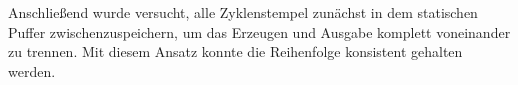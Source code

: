 Anschließend wurde versucht, alle Zyklenstempel zunächst in dem statischen
Puffer zwischenzuspeichern, um das Erzeugen und Ausgabe komplett voneinander zu
trennen. Mit diesem Ansatz konnte die Reihenfolge konsistent gehalten werden.

